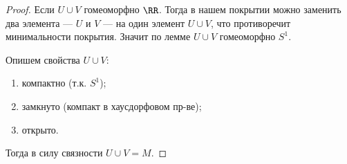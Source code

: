 \documentclass[12pt,a4paper]{article}
\begin{document}
\begin{proof}
        Если $U \cup V$ гомеоморфно $\RR$. Тогда в нашем покрытии можно заменить два элемента --- $U$ и $V$ --- на один элемент $U \cup V$, что противоречит минимальности покрытия. Значит по лемме $U \cup V$ гомеоморфно $S^1$.
        
        Опишем свойства $U \cup V$:
        \begin{enumerate}
            \item компактно (т.к. $S^1$);
            \item замкнуто (компакт в хаусдорфовом пр-ве);
            \item открыто.
        \end{enumerate}
        Тогда в силу связности $U \cup V = M$.
    \end{proof}
\end{document}
